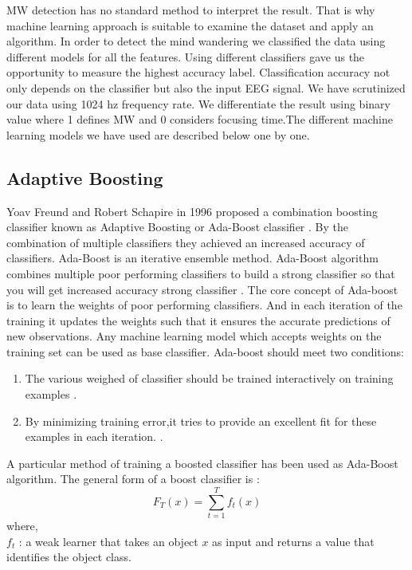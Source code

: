 MW detection has no standard method to interpret the result. That is why machine learning approach is suitable to examine the dataset and apply an algorithm. In order to detect the mind wandering we classified the data using different models for all the features. Using different classifiers gave us the opportunity to measure the highest accuracy label. Classification accuracy not only depends on the classifier but also the input EEG signal. We have scrutinized our data using 1024 hz frequency rate. We differentiate the result using binary value where 1 defines MW and 0 considers focusing time.The different machine learning models we have used are described below one by one.


\subsection{Adaptive Boosting}
Yoav Freund and Robert Schapire in 1996  proposed a combination boosting classifier  known as  Adaptive Boosting or Ada-Boost classifier  \cite{freund1996experiments}. By the combination of multiple classifiers they achieved an increased  accuracy of classifiers. Ada-Boost is an iterative ensemble method. Ada-Boost algorithm combines multiple poor performing classifiers to build a strong classifier so that you will get increased accuracy strong classifier  \cite{freund1996experiments}. The core concept  of Ada-boost is to learn the weights of poor performing classifiers. And in each iteration of the training it updates the weights  such that it ensures the accurate predictions of new observations. Any machine learning model which accepts weights on the training set can be used as base classifier. Ada-boost should meet two conditions:
\begin{enumerate}
    \item The various weighed of classifier should be trained interactively on  training examples \cite{freund1996experiments}.
    \item By minimizing training error,it tries to provide an excellent fit for these examples in each iteration.  \cite{freund1996experiments}.
\end{enumerate}

 A particular method of training a boosted classifier has been used as Ada-Boost algorithm. The general form of a boost classifier is :
\begin{equation}
F_T (x) = \sum_{t=1}^T  f_t(x) 
\end{equation}
where,\\
$f_{t}$ : a weak learner that takes an object $x$ as input and returns a value that identifies the  object class.


